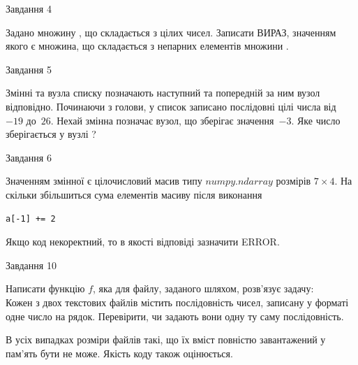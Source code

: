 \documentclass[12pt, ukrainian]{article}
\begin{document}
{\begin{minipage}[t]{8.0cm}
\end{minipage}


               
{\begin{center}Завдання {4}\end{center}}
\vspace{-4mm}
Задано множину , що складається з цілих чисел. Записати ВИРАЗ, значенням якого є множина, що складається  з непарних елементів множини .\par

\vspace{10mm}
               
{\begin{center}Завдання {5}\end{center}}
\vspace{-4mm}
Змінні  та  вузла списку позначають наступний та попередній за ним вузол відповідно. Починаючи з голови, у список записано послідовні цілі числа від~$-19$ до~$26$. Нехай змінна  позначає вузол, що зберігає значення~$-3$.
Яке число зберігається у вузлі  ?\par

               
{\begin{center}Завдання {6}\end{center}}
\vspace{-4mm}
Значенням змінної  є цілочисловий масив типу $numpy.ndarray$ розмірів $7{\times}4$. На скільки збільшиться сума елементів масиву  після виконання
\begin{verbatim}
a[-1] += 2
\end{verbatim}


Якщо код некоректний, то в якості відповіді зазначити ERROR.\par

               
{\begin{center}Завдання {10}\end{center}}
\vspace{-4mm}

Написати функцію $f$, яка для файлу, заданого шляхом, розв’язує задачу:\\ Кожен з двох текстових файлів містить послідовність чисел, записану у форматі одне число на рядок.  Перевірити, чи задають вони одну ту саму послідовність.

В усіх випадках розміри файлів такі, що їх вміст повністю завантажений у пам'ять бути не може. Якість коду також оцінюється.



}
\end{document}
